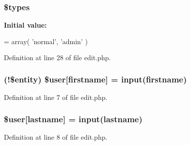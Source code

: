 \subsubsection[{\texorpdfstring{\$types}{$types}}]{\setlength{\rightskip}{0pt plus 5cm}\${\bf types}}\hypertarget{actions_2administrator_2user_2edit_8php_a92d70a97331cc6fc0a79d9da50895be8}{}\label{actions_2administrator_2user_2edit_8php_a92d70a97331cc6fc0a79d9da50895be8}
{\bfseries Initial value\+:}
\begin{DoxyCode}
= array(
    \textcolor{stringliteral}{'normal'},
    \textcolor{stringliteral}{'admin'}
)
\end{DoxyCode}


Definition at line 28 of file edit.\+php.

\subsubsection[{\texorpdfstring{\$user}{$user}}]{ (!\$entity) \${\bf user}\mbox{[}\textquotesingle{}firstname\textquotesingle{}\mbox{]} = {\bf input}(\textquotesingle{}firstname\textquotesingle{})}\hypertarget{actions_2administrator_2user_2edit_8php_aac0a0d9be0cd7bff33c25dc23bc48f69}{}\label{actions_2administrator_2user_2edit_8php_aac0a0d9be0cd7bff33c25dc23bc48f69}


Definition at line 7 of file edit.\+php.

\subsubsection[{\texorpdfstring{\$user}{$user}}]{\setlength{\rightskip}{0pt plus 5cm}\${\bf user}\mbox{[}\textquotesingle{}lastname\textquotesingle{}\mbox{]} = {\bf input}(\textquotesingle{}lastname\textquotesingle{})}\hypertarget{actions_2administrator_2user_2edit_8php_a1187774c6d9942181216e0839e5e73bc}{}\label{actions_2administrator_2user_2edit_8php_a1187774c6d9942181216e0839e5e73bc}


Definition at line 8 of file edit.\+php.

